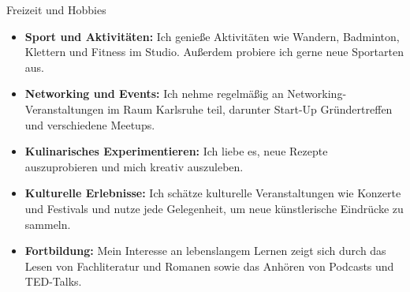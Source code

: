 \documentclass{resume} %
\begin{document}
\begin{rSection}{Freizeit und Hobbies}
    \begin{itemize}
        \item \raggedright{\textbf{Sport und Aktivitäten:} Ich genieße Aktivitäten wie Wandern, Badminton, Klettern und Fitness im Studio. Außerdem probiere ich gerne neue Sportarten aus.}
        \item \raggedright{\textbf{Networking und Events:} Ich nehme regelmäßig an Networking-Veranstaltungen im Raum Karlsruhe teil, darunter Start-Up Gründertreffen und verschiedene Meetups.}
        \item \raggedright{\textbf{Kulinarisches Experimentieren:} Ich liebe es, neue Rezepte auszuprobieren und mich kreativ auszuleben.} 
        \item \raggedright{\textbf{Kulturelle Erlebnisse:} Ich schätze kulturelle Veranstaltungen wie Konzerte und Festivals und nutze jede Gelegenheit, um neue künstlerische Eindrücke zu sammeln.}
        \item \raggedright{\textbf{Fortbildung:} Mein Interesse an lebenslangem Lernen zeigt sich durch das Lesen von Fachliteratur und Romanen sowie das Anhören von Podcasts und TED-Talks.}
    \end{itemize}


\end{rSection}
\end{document}
